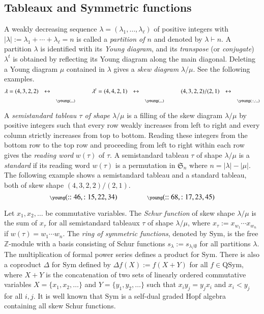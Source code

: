 \documentclass{amsart}
\newtheorem*{Young's Rule}{Young's Rule}
\theoremstyle{definition}
\theoremstyle{remark}
\numberwithin{equation}{section}
\begin{document}
\subsection{Tableaux and Symmetric functions}
A weakly decreasing sequence $\lambda=(\lambda_1,\ldots,\lambda_\ell)$ of positive integers with $|\lambda|:=\lambda_1+\cdots+\lambda_\ell=n$ is called a \emph{partition of $n$} and denoted by $\lambda\vdash n$. A partition $\lambda$ is identified with its \emph{Young diagram}, and its \emph{transpose} (or \emph{conjugate}) $\lambda^t$ is obtained by reflecting its Young diagram along the main diagonal. Deleting a Young diagram $\mu$ contained in $\lambda$ gives a \emph{skew diagram} $\lambda/\mu$. See the following examples.
\[ \scriptsize
\lambda = (4,3,2,2) \quad \leftrightarrow \quad 
\raisebox{-15pt}{\young(\hfill\hfill\hfill\hfill,\hfill\hfill\hfill,\hfill\hfill,\hfill\hfill)}
\qquad\qquad
\lambda^t = (4,4,2,1) \quad \leftrightarrow \quad 
\raisebox{-15pt}{\young(\hfill\hfill\hfill\hfill,\hfill\hfill\hfill\hfill,\hfill\hfill,\hfill)}
\qquad\qquad
(4,3,2,2)/(2,1) \quad \leftrightarrow \quad 
\raisebox{-15pt}{\young(::\hfill\hfill,:\hfill\hfill,\hfill\hfill,\hfill\hfill)}
\]

A \emph{semistandard tableau $\tau$ of shape $\lambda/\mu$} is a filling of the skew diagram $\lambda/\mu$ by positive integers such that every row weakly increases from left to right and every column strictly increases from top to bottom. Reading these integers from the bottom row to the top row and proceeding from left to right within each row gives the \emph{reading word} $w(\tau)$ of $\tau$. A semistandard tableau $\tau$ of shape $\lambda/\mu$ is a \emph{standard} if its reading word $w(\tau)$ is a permutation in ${{\mathfrak S}}_n$ where $n=|\lambda|-|\mu|$. The following example shows a semistandard tableau  and a standard tableau, both of skew shape $(4,3,2,2)/(2,1)$.
\[ \scriptsize \young(::46,:15,22,34) \qquad\qquad\qquad \young(::68,:17,23,45) \]

Let $x_1,x_2,\ldots$ be commutative variables. The \emph{Schur function} of skew shape $\lambda/\mu$ is the sum of $x_\tau$ for all semistandard tableaux $\tau$ of shape $\lambda/\mu$, where $x_{\tau}:=x_{w_1}\cdots x_{w_n}$ if $w(\tau)=w_1\cdots w_n$.
The \emph{ring of symmetric functions}, denoted by ${\mathrm{Sym}}$, is the free ${{\mathbb Z}}$-module with a basis consisting of Schur functions $s_\lambda:=s_{\lambda/\emptyset}$ for all partitions $\lambda$. The multiplication of formal power series defines a product for ${\mathrm{Sym}}$. There is also a coproduct $\Delta$ for ${\mathrm{Sym}}$ defined by $\Delta f(X):=f(X+Y)$ for all $f\in{\mathrm{QSym}}$, where $X+Y$ is the concatenation of two sets of linearly ordered commutative variables $X=\{x_1,x_2,\ldots\}$ and $Y=\{y_1,y_2,\ldots\}$ such that $x_iy_j=y_jx_i$ and $x_i<y_j$ for all $i,j$. It is well known that ${\mathrm{Sym}}$ is a self-dual graded Hopf algebra containing all skew Schur functions. 
\end{document}
